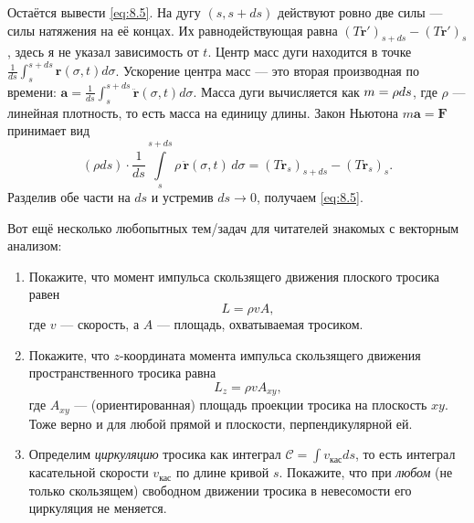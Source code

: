 Остаётся вывести \eqref{eq:8.5}.
На дугу $(s, s+ds)$ действуют ровно две силы --- силы натяжения на её концах.
Их равнодействующая равна
$(T \mathbf{r}')_{s+ds} - (T \mathbf{r}')_s$,
здесь я не указал зависимость от $t$.
Центр масс дуги находится в точке $
\tfrac{1}{ds} \int_s^{s+ds} \mathbf{r}(\sigma, t) d\sigma$.
Ускорение центра масс --- это вторая производная по времени:
$\mathbf{a}=\tfrac{1}{ds} \int_s^{s+ds} \ddot{\mathbf{r}}(\sigma, t) d\sigma$.
Масса дуги вычисляется как $m \z= \rho ds$, где $\rho$ --- линейная плотность, то есть масса на единицу длины.
Закон Ньютона $m\mathbf{a}=\mathbf{F}$ принимает вид
\begin{equation}
(\rho ds)
\cdot
\frac{1}{ds}
\int\limits_s^{s+ds}
\rho\,\ddot{\mathbf{r}}(\sigma, t)\, d\sigma
= (T \mathbf{r}_s)_{s+ds} - (T \mathbf{r}_s)_s .
\end{equation}
Разделив обе части на $ds$ и устремив $ds \to 0$, получаем \eqref{eq:8.5}.

\medskip

Вот ещё несколько любопытных тем/задач для читателей знакомых с векторным анализом:

\begin{enumerate}
\item Покажите, что момент импульса скользящего движения плоского тросика равен
\begin{equation}
L=\rho v A ,
\end{equation}
где $v$ --- скорость, а $A$ --- площадь, охватываемая тросиком.
\item Покажите, что $z$-координата момента импульса скользящего движения пространственного тросика равна
\begin{equation}
L_z=\rho v A_{xy},
\end{equation}
где $A_{xy}$ --- (ориентированная) площадь проекции тросика на плоскость $xy$.
Тоже верно и для любой прямой и плоскости, перпендикулярной ей.
\item Определим \emph{циркуляцию} тросика как интеграл
$\mathcal{C}=\int v_{\text{кас}} ds$,
то есть интеграл касательной скорости $v_{\text{кас}}$ по длине кривой $s$.
Покажите, что при \emph{любом} (не только скользящем) свободном движении тросика в невесомости
его циркуляция не меняется.
\end{enumerate}

